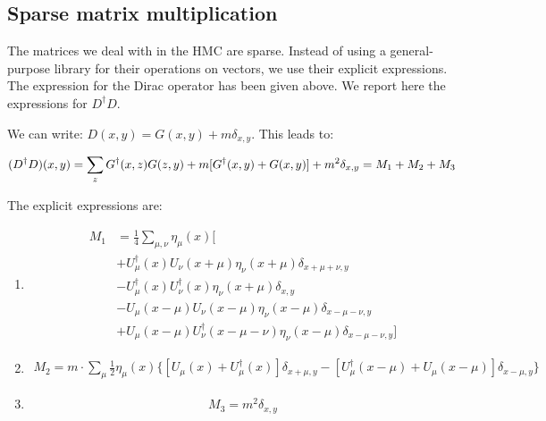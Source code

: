 \documentclass[12pt, a4paper]{article}
\begin{document}
  

\subsection{Sparse matrix multiplication}

The matrices we deal with in the HMC are sparse. 
Instead of using a general-purpose library for their operations on vectors, 
we use their explicit expressions. 
The expression for the Dirac operator has been given above. 
We report here the expressions for $D^{\dagger} D$.

We can write: $D(x,y) = G(x,y) + m \delta_{x,y}$. 
This leads to:

$$
(D^{\dagger} D) (x,y) = 
\sum_{z} G^{\dagger}(x,z) G(z,y)
+ m [ G^{\dagger}(x,y) + G(x,y) ]
+ m^2 \delta_{x,y} \\
= M_1 + M_2 + M_3
$$

The explicit expressions are:

\begin{enumerate}
\item
\begin{equation}
\begin{aligned}
  M_1 
  &= 
  \frac{1}{4} \sum_{\mu, \nu} \eta_\mu(x)
  [ 
\\
  &+ U_\mu^{\dagger}(x) U_\nu(x+\mu) 
  \eta_{\nu}(x+\mu) \delta_{x+\mu+\nu, y}
   \\
  &- U_{\mu}^{\dagger}(x) U_{\nu}^{\dagger}(x) 
  \eta_{\nu}(x+\mu) \delta_{x,y}
  \\
  &- U_{\mu}(x-\mu) U_{\nu}(x-\mu) 
  \eta_{\nu}(x-\mu) \delta_{x-\mu-\nu,y}
   \\
  &+ U_{\mu}(x-\mu) U_{\nu}^{\dagger}(x-\mu-\nu) 
  \eta_{\nu}(x-\mu) \delta_{x-\mu-\nu,y}
  ]
\end{aligned}
\end{equation}

\item
\begin{equation}
\begin{aligned}
    M_2 = m \cdot \sum_{\mu} \frac{1}{2} \eta_{\mu}(x) 
    \{
      [ U_{\mu}(x) + U_{\mu}^{\dagger}(x) ] 
      \delta_{x+\mu, y} -
      [ U^{\dagger}_{\mu}(x-\mu) + U_{\mu}(x-\mu) ] 
      \delta_{x-\mu, y}
    \}  
\end{aligned}
\end{equation}

\item  
\begin{equation}
  M_3 = m^2 \delta_{x,y}
\end{equation}

\end{enumerate}
\end{document}
